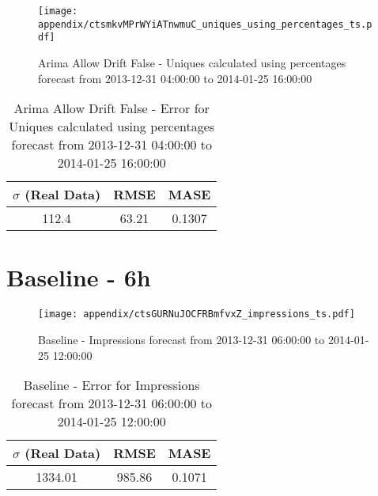 \begin{figure}[H] \begin{center} \leavevmode
\texttt{[image: appendix/ctsmkvMPrWYiATnwmuC\_uniques\_using\_percentages\_ts.pdf]} \caption{
Arima Allow Drift False - Uniques calculated using percentages forecast from 2013-12-31 04:00:00 to 2014-01-25 16:00:00} \label{fig:appendix/ctsmkvMPrWYiATnwmuC_uniques_using_percentages_ts.pdf} \end{center}
\end{figure}

\begin{table}[H]
\centering
\footnotesize
\begin{tabular}{ccc}
$\sigma$ (Real Data) & RMSE & MASE   \\ \hline
112.4 & 63.21 & 0.1307 \\
\end{tabular}

\vspace{0.5cm}

\caption{
Arima Allow Drift False - Error for Uniques calculated using percentages forecast from 2013-12-31 04:00:00 to 2014-01-25 16:00:00}
\end{table}

\section{Baseline - 6h}
\begin{figure}[H] \begin{center} \leavevmode
\texttt{[image: appendix/ctsGURNuJOCFRBmfvxZ\_impressions\_ts.pdf]} \caption{
Baseline - Impressions forecast from 2013-12-31 06:00:00 to 2014-01-25 12:00:00} \label{fig:appendix/ctsGURNuJOCFRBmfvxZ_impressions_ts.pdf} \end{center}
\end{figure}

\begin{table}[H]
\centering
\footnotesize
\begin{tabular}{ccc}
$\sigma$ (Real Data) & RMSE & MASE   \\ \hline
1334.01 & 985.86 & 0.1071 \\
\end{tabular}

\vspace{0.5cm}

\caption{
Baseline - Error for Impressions forecast from 2013-12-31 06:00:00 to 2014-01-25 12:00:00}
\end{table}

